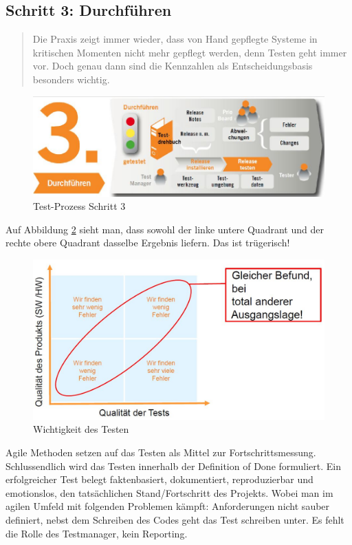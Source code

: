 \subsection{Schritt 3: Durchführen}

\begin{quote}
	Die Praxis zeigt immer wieder, dass von Hand gepflegte Systeme in kritischen Momenten nicht mehr gepflegt werden, denn Testen geht immer vor. Doch genau dann sind die Kennzahlen als Entscheidungsbasis besonders wichtig.
\end{quote}

\begin{figure}[h!]
\centering
\includegraphics[width=0.7\linewidth]{fig/test-prozess-schritt-3}
\caption{Test-Prozess Schritt 3}
\label{fig:test-prozess-schritt-3}
\end{figure}

Auf Abbildung \ref{fig:wichtigkeit-des-testen} sieht man, dass sowohl der linke untere Quadrant und der rechte obere Quadrant dasselbe Ergebnis liefern. Das ist trügerisch!

\begin{figure}[h!]
\centering
\includegraphics[width=0.7\linewidth]{fig/wichtigkeit-des-testen}
\caption{Wichtigkeit des Testen}
\label{fig:wichtigkeit-des-testen}
\end{figure}

Agile Methoden setzen auf das Testen als Mittel zur Fortschrittsmessung. Schlussendlich wird das Testen innerhalb der Definition of Done formuliert. Ein erfolgreicher Test belegt faktenbasiert, dokumentiert, reproduzierbar und emotionslos, den tatsächlichen Stand/Fortschritt des Projekts. Wobei man im agilen Umfeld mit folgenden Problemen kämpft: Anforderungen nicht sauber definiert, nebst dem Schreiben des Codes geht das Test schreiben unter. Es fehlt die Rolle des Testmanager, kein Reporting. 

